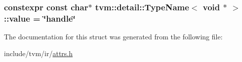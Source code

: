 \subsubsection[{\texorpdfstring{value}{value}}]{\setlength{\rightskip}{0pt plus 5cm}constexpr const char$\ast$ {\bf tvm\+::detail\+::\+Type\+Name}$<$ void $\ast$ $>$\+::value = \char`\"{}handle\char`\"{}\hspace{0.3cm}{\ttfamily [static]}}\hypertarget{structtvm_1_1detail_1_1TypeName_3_01void_01_5_01_4_a05dde8e9fdc15287aa0b1bf8d2e4b584}{}\label{structtvm_1_1detail_1_1TypeName_3_01void_01_5_01_4_a05dde8e9fdc15287aa0b1bf8d2e4b584}


The documentation for this struct was generated from the following file\+:\begin{DoxyCompactItemize}
\item 
include/tvm/ir/\hyperlink{ir_2attrs_8h}{attrs.\+h}\end{DoxyCompactItemize}

